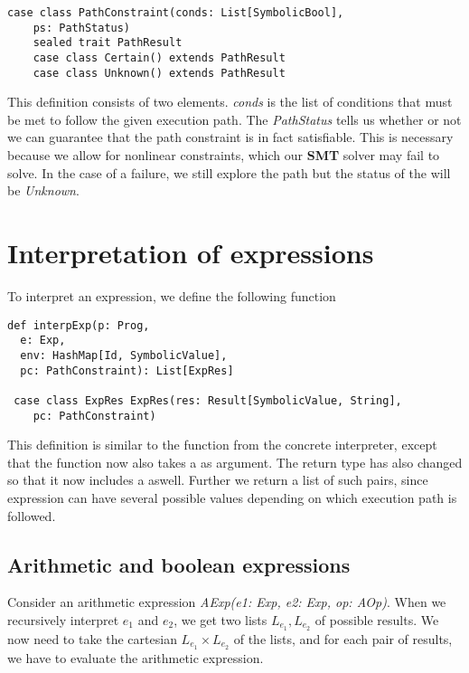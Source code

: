 \begin{lstlisting}[style=simple]
case class PathConstraint(conds: List[SymbolicBool],
	ps: PathStatus)
	sealed trait PathResult
	case class Certain() extends PathResult
	case class Unknown() extends PathResult
\end{lstlisting}

This definition consists of two elements. \textsl{conds} is the list of conditions that must be met to follow the given execution path. The \textsl{PathStatus} tells us whether or not we can guarantee that the path constraint is in fact satisfiable. This is necessary because we allow for nonlinear constraints, which our \textbf{SMT} solver may fail to solve. In the case of a failure, we still explore the path but the status of the \pc will be \textsl{Unknown}.  

\section{Interpretation of expressions}
To interpret an expression, we define the following function

\begin{lstlisting}[style = simple]
 def interpExp(p: Prog,
  e: Exp, 
  env: HashMap[Id, SymbolicValue],
  pc: PathConstraint): List[ExpRes]
  
 case class ExpRes ExpRes(res: Result[SymbolicValue, String], 
 	pc: PathConstraint)
\end{lstlisting}
This definition is similar to the function from the concrete interpreter, except that the function now also takes a \pc as argument. The return type has also changed so that it now includes a \pc aswell. Further we return a list of such pairs, since expression can have several possible values depending on which execution path is followed. 

\subsection{Arithmetic and boolean expressions}
Consider an arithmetic expression 
\textsl{AExp(e1: Exp, e2: Exp, op: AOp)}. When we recursively interpret $e_1$ and $e_2$, we get two lists $L_{e_1}, L_{e_2}$ of possible results. We now need to take the cartesian $L_{e_1} \times L_{e_2}$ of the lists, and for each pair of results, we have to evaluate the arithmetic expression. 

